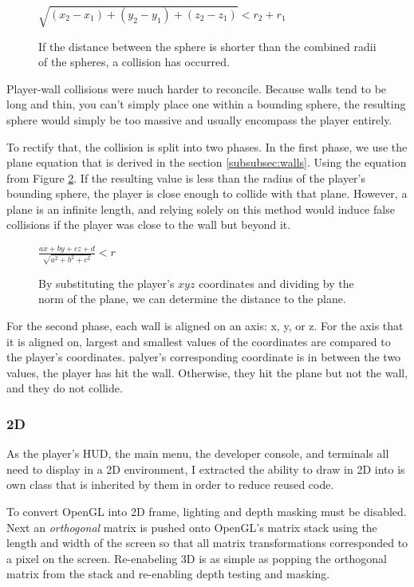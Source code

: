 \documentclass{article}
\begin{document}
\begin{figure}[H]
	\centering
	$\sqrt{(x_2 - x_1) + (y_2 - y_1) + (z_2 - z_1)} < r_2 + r_1$
	\caption{If the distance between the sphere is shorter than the combined radii of the spheres, a collision has occurred.}
	\label{fig:collisionsphere}
\end{figure}

Player-wall collisions were much harder to reconcile. Because walls tend to be long and thin, you can't simply place one within a bounding sphere, the resulting sphere would simply be too massive and usually encompass the player entirely. 

To rectify that, the collision is split into two phases. In the first phase, we use the plane equation that is derived in the section \ref{subsubsec:walls}. Using the equation from Figure \ref{fig:wallcollision}. If the resulting value is less than the radius of the player's bounding sphere, the player is close enough to collide with that plane. However, a plane is an infinite length, and relying solely on this method would induce false collisions if the player was close to the wall but beyond it.

\begin{figure}[H]
	\centering
	$\frac{ax + by + cz + d}{\sqrt{a^2 + b^2 + c^2}} < r$
	\caption{By substituting the player's $xyz$ coordinates and dividing by the norm of the plane, we can determine the distance to the plane.}
	\label{fig:wallcollision}
\end{figure}

For the second phase, each wall is aligned on an axis: x, y, or z. For the axis that it is aligned on, largest and smallest values of the coordinates are compared to the player's coordinates. palyer's corresponding coordinate is in between the two values, the player has hit the wall. Otherwise, they hit the plane but not the wall, and they do not collide.

\subsubsection{2D} \label{subsubsec:2D}

As the player's HUD, the main menu, the developer console, and terminals all need to display in a 2D environment, I extracted the ability to draw in 2D into is own class that is inherited by them in order to reduce reused code.

To convert OpenGL into 2D frame, lighting and depth masking must be disabled. Next an \emph{orthogonal} matrix is pushed onto OpenGL's matrix stack using the length and width of the screen so that all matrix transformations corresponded to a pixel on the screen. Re-enabeling 3D is as simple as popping the orthogonal matrix from the stack and re-enabling depth testing and masking.
\end{document}
